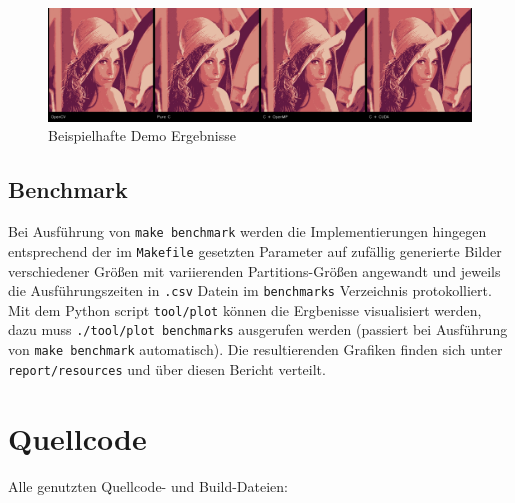 \documentclass[
    bibliography=totoc, cd=lightcolor, cdmath=false, ngerman]{tudscrreprt}
\begin{document}
\begin{figure}[h]
\centering
\includegraphics[width=\textwidth]{report/resources/demo_results.jpg}
\caption{Beispielhafte Demo Ergebnisse}
\label{img:demoresults}
\end{figure}

\section{Benchmark}

Bei Ausführung von \texttt{make benchmark} werden die Implementierungen
hingegen entsprechend der im \texttt{Makefile} gesetzten Parameter auf zufällig
generierte Bilder verschiedener Größen mit variierenden Partitions-Größen
angewandt und jeweils die Ausführungszeiten in \texttt{.csv} Datein im
\texttt{benchmarks} Verzeichnis protokolliert. Mit dem Python script
\texttt{tool/plot} können die Ergbenisse visualisiert werden, dazu muss
\texttt{./tool/plot benchmarks} ausgerufen werden (passiert bei Ausführung von
\texttt{make benchmark} automatisch). Die resultierenden Grafiken finden sich
unter \texttt{report/resources} und über diesen Bericht verteilt.

\chapter{Quellcode}

Alle genutzten Quellcode- und Build-Dateien:

\inputminted{C}{c/include/kmeans.h}

\inputminted{C}{config/kmeans_config.h}

\inputminted{C}{c/src/kmeans.c}

\inputminted{C}{cpp/include/kmeans_wrapper.h}

\inputminted{C}{cpp/src/kmeans_wrapper.cc}

\inputminted{C}{cpp/src/kmeans_benchmark.cc}
\end{document}
